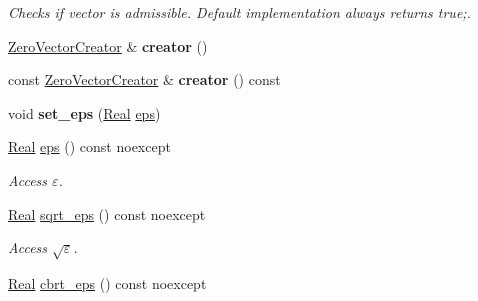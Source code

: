 \begin{DoxyCompactItemize}
\begin{DoxyCompactList}\small\item\em Checks if vector is admissible. Default implementation always returns true;. \end{DoxyCompactList}\item 
\hypertarget{classSpacy_1_1VectorSpace_a254d66fbb07d0abfaa583aba520d3dc3}{\hyperlink{classSpacy_1_1ZeroVectorCreator}{Zero\-Vector\-Creator} \& {\bfseries creator} ()}\label{classSpacy_1_1VectorSpace_a254d66fbb07d0abfaa583aba520d3dc3}

\item 
\hypertarget{classSpacy_1_1VectorSpace_acc3d5b5210cc810d8011e8a4308150e7}{const \hyperlink{classSpacy_1_1ZeroVectorCreator}{Zero\-Vector\-Creator} \& {\bfseries creator} () const }\label{classSpacy_1_1VectorSpace_acc3d5b5210cc810d8011e8a4308150e7}

\item 
\hypertarget{classSpacy_1_1Mixin_1_1Eps_a818ab6dfab5e4eea583e1302bcc621f8}{void {\bfseries set\-\_\-eps} (\hyperlink{classSpacy_1_1Real}{Real} \hyperlink{classSpacy_1_1Mixin_1_1Eps_a812b99b0abc1d78a34b4114907f23f52}{eps})}\label{classSpacy_1_1Mixin_1_1Eps_a818ab6dfab5e4eea583e1302bcc621f8}

\item 
\hypertarget{classSpacy_1_1Mixin_1_1Eps_a812b99b0abc1d78a34b4114907f23f52}{\hyperlink{classSpacy_1_1Real}{Real} \hyperlink{classSpacy_1_1Mixin_1_1Eps_a812b99b0abc1d78a34b4114907f23f52}{eps} () const noexcept}\label{classSpacy_1_1Mixin_1_1Eps_a812b99b0abc1d78a34b4114907f23f52}

\begin{DoxyCompactList}\small\item\em Access $\varepsilon$. \end{DoxyCompactList}\item 
\hypertarget{classSpacy_1_1Mixin_1_1Eps_a1c1b0ed7f14ed4967dc7da9295a136d4}{\hyperlink{classSpacy_1_1Real}{Real} \hyperlink{classSpacy_1_1Mixin_1_1Eps_a1c1b0ed7f14ed4967dc7da9295a136d4}{sqrt\-\_\-eps} () const noexcept}\label{classSpacy_1_1Mixin_1_1Eps_a1c1b0ed7f14ed4967dc7da9295a136d4}

\begin{DoxyCompactList}\small\item\em Access $\sqrt\varepsilon$. \end{DoxyCompactList}\item 
\hypertarget{classSpacy_1_1Mixin_1_1Eps_a91dbe45e297be2bc53f1a96107a58c64}{\hyperlink{classSpacy_1_1Real}{Real} \hyperlink{classSpacy_1_1Mixin_1_1Eps_a91dbe45e297be2bc53f1a96107a58c64}{cbrt\-\_\-eps} () const noexcept}\label{classSpacy_1_1Mixin_1_1Eps_a91dbe45e297be2bc53f1a96107a58c64}


\end{DoxyCompactItemize}
